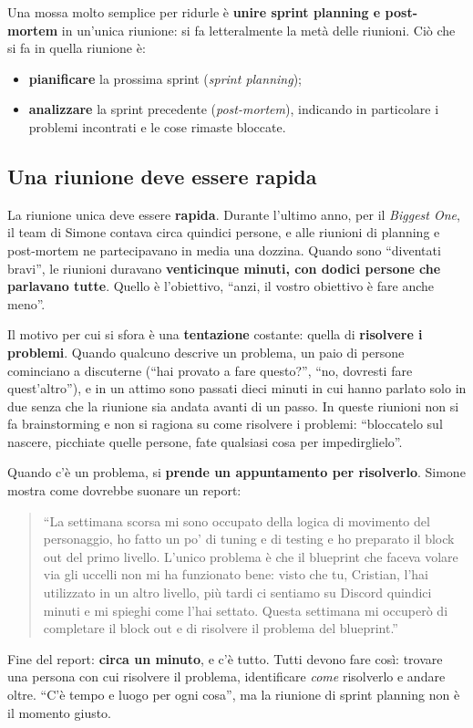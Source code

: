 Una mossa molto semplice per ridurle è \textbf{unire sprint planning e
post-mortem} in un'unica riunione: si fa letteralmente la metà delle
riunioni. Ciò che si fa in quella riunione è:
\begin{itemize}
  \item \textbf{pianificare} la prossima sprint (\emph{sprint planning});
  \item \textbf{analizzare} la sprint precedente (\emph{post-mortem}),
        indicando in particolare i problemi incontrati e le cose rimaste
        bloccate.
\end{itemize}

\subsection{Una riunione deve essere rapida}

La riunione unica deve essere \textbf{rapida}. Durante l'ultimo anno, per il
\emph{Biggest One}, il team di Simone contava circa quindici persone, e alle
riunioni di planning e post-mortem ne partecipavano in media una dozzina.
Quando sono ``diventati bravi'', le riunioni duravano \textbf{venticinque
minuti, con dodici persone che parlavano tutte}. Quello è l'obiettivo, ``anzi,
il vostro obiettivo è fare anche meno''.

Il motivo per cui si sfora è una \textbf{tentazione} costante: quella di
\textbf{risolvere i problemi}. Quando qualcuno descrive un problema, un paio
di persone cominciano a discuterne (``hai provato a fare questo?'', ``no,
dovresti fare quest'altro''), e in un attimo sono passati dieci minuti in cui
hanno parlato solo in due senza che la riunione sia andata avanti di un
passo. In queste riunioni non si fa brainstorming e non si ragiona su come
risolvere i problemi: ``bloccatelo sul nascere, picchiate quelle persone, fate
qualsiasi cosa per impedirglielo''.

Quando c'è un problema, si \textbf{prende un appuntamento per risolverlo}.
Simone mostra come dovrebbe suonare un report:
\begin{quote}
``La settimana scorsa mi sono occupato della logica di movimento del
personaggio, ho fatto un po' di tuning e di testing e ho preparato il block
out del primo livello. L'unico problema è che il blueprint che faceva volare
via gli uccelli non mi ha funzionato bene: visto che tu, Cristian, l'hai
utilizzato in un altro livello, più tardi ci sentiamo su Discord quindici
minuti e mi spieghi come l'hai settato. Questa settimana mi occuperò di
completare il block out e di risolvere il problema del blueprint.''
\end{quote}
Fine del report: \textbf{circa un minuto}, e c'è tutto. Tutti devono fare
così: trovare una persona con cui risolvere il problema, identificare
\emph{come} risolverlo e andare oltre. ``C'è tempo e luogo per ogni cosa'', ma
la riunione di sprint planning non è il momento giusto.

